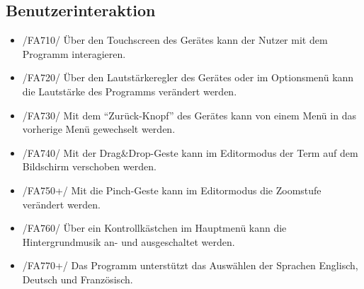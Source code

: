\subsection{Benutzerinteraktion}

\begin{itemize}
\item /FA710/ Über den Touchscreen des Gerätes kann der Nutzer mit dem Programm interagieren.
\item /FA720/ Über den Lautstärkeregler des Gerätes oder im Optionsmenü kann die Lautstärke des Programms verändert werden.
\item /FA730/ Mit dem "`Zurück-Knopf"' des Gerätes kann von einem Menü in das vorherige Menü gewechselt werden.
\item /FA740/ Mit der Drag\&Drop-Geste kann im Editormodus der Term auf dem Bildschirm verschoben werden.
\item /FA750+/ Mit die Pinch-Geste kann im Editormodus die Zoomstufe verändert werden.
\item /FA760/ Über ein Kontrollkästchen im Hauptmenü kann die Hintergrundmusik an- und ausgeschaltet werden.
\item /FA770+/ Das Programm unterstützt das Auswählen der Sprachen Englisch, Deutsch und Französisch.
\end{itemize}
